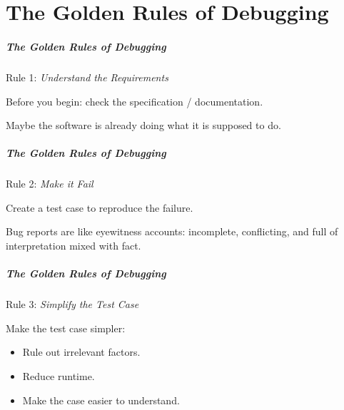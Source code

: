 \part{The Golden Rules of Debugging}

\begin{frame}
\frametitle{The Golden Rules of Debugging}
\begin{changemargin}{1cm}

Rule 1: \emph{Understand the Requirements}

Before you begin: check the specification / documentation.

Maybe the software is already doing what it is supposed to do.

\end{changemargin}
\end{frame}

\begin{frame}
\frametitle{The Golden Rules of Debugging}
\begin{changemargin}{1cm}

Rule 2: \emph{Make it Fail}

Create a test case to reproduce the failure. 

Bug reports are like eyewitness accounts: incomplete, conflicting, and full of interpretation mixed with fact. 

\end{changemargin}
\end{frame}

\begin{frame}
\frametitle{The Golden Rules of Debugging}
\begin{changemargin}{1cm}

Rule 3: \emph{Simplify the Test Case}

Make the test case simpler:

\begin{itemize}
	\item Rule out irrelevant factors.
	\item Reduce runtime.
	\item Make the case easier to understand.
\end{itemize}

\end{changemargin}
\end{frame}

